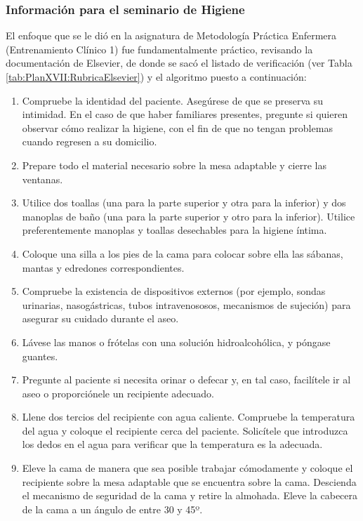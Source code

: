 \subsubsection{Información para el seminario de Higiene}
El enfoque que se le dió en la asignatura de Metodología Práctica Enfermera (Entrenamiento Clínico 1) fue fundamentalmente práctico, revisando la documentación de Elsevier, de donde se sacó el listado de verificación (ver Tabla \ref{tab:PlanXVII:RubricaElsevier}) y el algoritmo puesto a continuación:
\begin{enumerate}[topsep=0pt, partopsep=0pt,itemsep=0pt,parsep=0pt]
    \item Compruebe la identidad del paciente. Asegúrese de que se preserva su intimidad. En el caso de que haber familiares presentes, pregunte si quieren observar cómo realizar la higiene, con el fin de que no tengan problemas cuando regresen a su domicilio.
    \item Prepare todo el material necesario sobre la mesa adaptable y cierre las ventanas.
    \item Utilice dos toallas (una para la parte superior y otra para la inferior) y dos manoplas de baño (una para la parte superior y otro para la inferior). Utilice preferentemente manoplas y toallas desechables para la higiene íntima.
    \item Coloque una silla a los pies de la cama para colocar sobre ella las sábanas, mantas y edredones correspondientes.
    \item Compruebe la existencia de dispositivos externos (por ejemplo, sondas urinarias, nasogástricas, tubos intravenososos, mecanismos de sujeción) para asegurar su cuidado durante el aseo.
    \item Lávese las manos o frótelas con una solución hidroalcohólica, y póngase guantes.
    \item Pregunte al paciente si necesita orinar o defecar y, en tal caso, facilítele ir al aseo o proporciónele un recipiente adecuado.
    \item Llene dos tercios del recipiente con agua caliente. Compruebe la temperatura del agua y coloque el recipiente cerca del paciente. Solicítele que introduzca los dedos en el agua para verificar que la temperatura es la adecuada. 
    \item Eleve la cama de manera que sea posible trabajar cómodamente y coloque el recipiente sobre la mesa adaptable que se encuentra sobre la cama. Descienda el mecanismo de seguridad de la cama y retire la almohada. Eleve la cabecera de la cama a un ángulo de entre 30 y 45º.

\end{enumerate}
